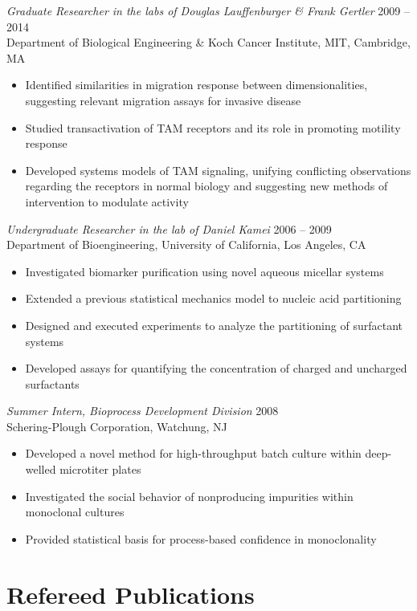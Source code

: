 \documentclass[11pt]{res}
\begin{document}
\begin{resume}
{\sl Graduate Researcher in the labs of Douglas Lauffenburger \& Frank Gertler} \hfill 2009 -- 2014 \\
Department of Biological Engineering \& Koch Cancer Institute, MIT, Cambridge, MA 
\begin{itemize}
\item Identified similarities in migration response between dimensionalities, suggesting relevant migration  assays for invasive disease
\item Studied transactivation of TAM receptors and its role in promoting motility response
\item Developed systems models of TAM signaling, unifying conflicting observations regarding the receptors in normal biology and suggesting new methods of intervention to modulate activity
\end{itemize}

{\sl Undergraduate Researcher in the lab of Daniel Kamei} \hfill 2006 -- 2009 \\ 
Department of Bioengineering, University of California, Los Angeles, CA 
\begin{itemize}
\item Investigated biomarker purification using novel aqueous micellar systems
\item Extended a previous statistical mechanics model to nucleic acid partitioning
\item Designed and executed experiments to analyze the partitioning of surfactant systems
\item Developed assays for quantifying the concentration of charged and uncharged surfactants
\end{itemize}

{\sl Summer Intern, Bioprocess Development Division} \hfill 2008 \\ 
Schering-Plough Corporation, Watchung, NJ
\begin{itemize}
\item Developed a novel method for high-throughput batch culture within deep-welled microtiter plates
\item Investigated the social behavior of nonproducing impurities within monoclonal cultures
\item Provided statistical basis for process-based confidence in monoclonality
\end{itemize}





\section{Refereed Publications}
{ \leftskip 0.1in
\parindent -0.1in

}
\end{resume}
\end{document}

